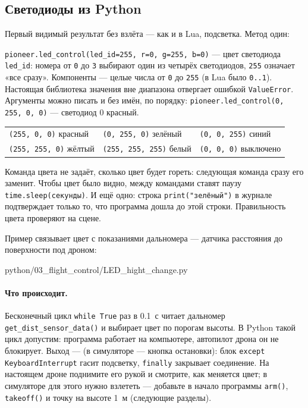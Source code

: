 \subsection{Светодиоды из Python}
\label{sec:python-leds}

Первый видимый результат без взлёта --- как и в Lua, подсветка. Метод один:

\begin{codebox}
\verb|pioneer.led_control(led_id=255, r=0, g=255, b=0)| --- цвет светодиода \verb|led_id|: номера от \verb|0| до \verb|3| выбирают один из четырёх светодиодов, \verb|255| означает «все сразу». Компоненты --- целые числа от \verb|0| до \verb|255| (в Lua было \verb|0..1|). Настоящая библиотека значения вне диапазона отвергает ошибкой \verb|ValueError|. Аргументы можно писать и без имён, по порядку: \verb|pioneer.led_control(0, 255, 0, 0)| --- светодиод 0 красный.
\end{codebox}

\begin{center}
\small
\begin{tabular}{@{}lll@{}}
\toprule
\verb|(255, 0, 0)| красный & \verb|(0, 255, 0)| зелёный & \verb|(0, 0, 255)| синий \\
\verb|(255, 255, 0)| жёлтый & \verb|(255, 255, 255)| белый & \verb|(0, 0, 0)| выключено \\
\bottomrule
\end{tabular}
\end{center}

Команда цвета не задаёт, сколько цвет будет гореть: следующая команда сразу его заменит. Чтобы цвет было видно, между командами ставят паузу \verb|time.sleep(секунды)|. И ещё одно: строка \verb|print("зелёный")| в журнале подтверждает только то, что программа дошла до этой строки. Правильность цвета проверяют на сцене.

Пример связывает цвет с показаниями дальномера --- датчика расстояния до поверхности под дроном:

\begin{codefile}[python]{python/03_flight_control/LED_hight_change.py}
\end{codefile}

\paragraph{Что происходит.} Бесконечный цикл \verb|while True| раз в 0.1~с читает дальномер \verb|get_dist_sensor_data()| и выбирает цвет по порогам высоты. В Python такой цикл допустим: программа работает на компьютере, автопилот дрона он не блокирует. Выход ---  (в симуляторе --- кнопка остановки): блок \verb|except KeyboardInterrupt| гасит подсветку, \verb|finally| закрывает соединение. На настоящем дроне поднимите его рукой и смотрите, как меняется цвет; в симуляторе для этого нужно взлететь --- добавьте в начало программы \verb|arm()|, \verb|takeoff()| и точку на высоте 1~м (следующие разделы).

